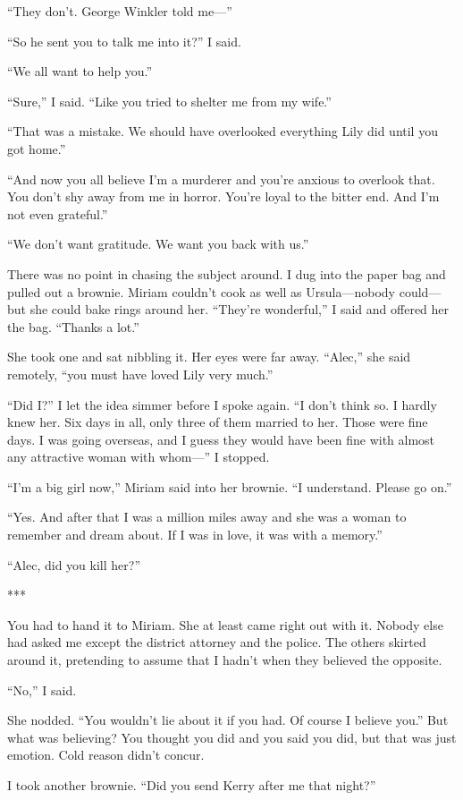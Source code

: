 \documentclass{novel}
\begin{document}
{“They don’t. George Winkler told me—”

“So he sent you to talk me into it?” I said.

“We all want to help you.”

“Sure,” I said. “Like you tried to shelter me from my wife.”

“That was a mistake. We should have overlooked everything Lily did until you got home.”

“And now you all believe I’m a murderer and you’re anxious to overlook that. You don’t shy away from me in horror. You’re loyal to the bitter end. And I’m not even grateful.”

“We don’t want gratitude. We want you back with us.”

There was no point in chasing the subject around. I dug into the paper bag and pulled out a brownie. Miriam couldn’t cook as well as Ursula—nobody could—but she could bake rings around her. “They’re wonderful,” I said and offered her the bag. “Thanks a lot.”

She took one and sat nibbling it. Her eyes were far away. “Alec,” she said remotely, “you must have loved Lily very much.”

“Did I?” I let the idea simmer before I spoke again. “I don’t think so. I hardly knew her. Six days in all, only three of them married to her. Those were fine days. I was going overseas, and I guess they would have been fine with almost any attractive woman with whom—” I stopped.

“I’m a big girl now,” Miriam said into her brownie. “I understand. Please go on.”

“Yes. And after that I was a million miles away and she was a woman to remember and dream about. If I was in love, it was with a memory.”

“Alec, did you kill her?”

***

You had to hand it to Miriam. She at least came right out with it. Nobody else had asked me except the district attorney and the police. The others skirted around it, pretending to assume that I hadn’t when they believed the opposite.

“No,” I said.

She nodded. “You wouldn’t lie about it if you had. Of course I believe you.” But what was believing? You thought you did and you said you did, but that was just emotion. Cold reason didn’t concur.

I took another brownie. “Did you send Kerry after me that night?”

}
\end{document}
